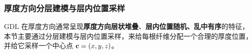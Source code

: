
\subsubsection{\textbf{厚度方向分层建模与层内位置采样}}

GDL 在厚度方向通常呈现\textbf{厚度方向层状堆叠}、\textbf{层内位置随机、乱中有序}的特征\cite{wen2025progress}，本节主要通过分层建模与层内位置采样，来给每根纤维分配一个合理的厚度位置，并给它采样一个中心点 $\textbf c = (x,y,z)$。

